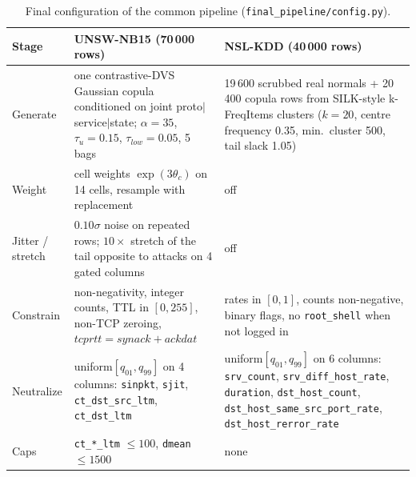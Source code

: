 \documentclass[10pt,a4paper]{article}
\begin{document}
\begin{table}[t]\centering\small
\begin{tabular}{P{2.0cm}P{6.7cm}P{6.7cm}}\toprule
Stage & UNSW-NB15 (70\,000 rows) & NSL-KDD (40\,000 rows)\\\midrule
Generate & one contrastive-DVS Gaussian copula conditioned on joint proto$|$service$|$state; $\alpha{=}35$, $\tau_{u}{=}0.15$, $\tau_{low}{=}0.05$, 5 bags & 19\,600 scrubbed real normals + 20\,400 copula rows from SILK-style k-FreqItems clusters ($k{=}20$, centre frequency 0.35, min.\ cluster 500, tail slack 1.05)\\
Weight & cell weights $\exp(3\theta_c)$ on 14 cells, resample with replacement & off\\
Jitter / stretch & $0.10\sigma$ noise on repeated rows; $10\times$ stretch of the tail opposite to attacks on 4 gated columns & off\\
Constrain & non-negativity, integer counts, TTL in $[0,255]$, non-TCP zeroing, $\textit{tcprtt}=\textit{synack}+\textit{ackdat}$ & rates in $[0,1]$, counts non-negative, binary flags, no \texttt{root\_shell} when not logged in\\
Neutralize & uniform$[q_{01},q_{99}]$ on 4 columns: \texttt{sinpkt}, \texttt{sjit}, \texttt{ct\_dst\_src\_ltm}, \texttt{ct\_dst\_ltm} & uniform$[q_{01},q_{99}]$ on 6 columns: \texttt{srv\_count}, \texttt{srv\_diff\_host\_rate}, \texttt{duration}, \texttt{dst\_host\_count}, \texttt{dst\_host\_same\_src\_port\_rate}, \texttt{dst\_host\_rerror\_rate}\\
Caps & \texttt{ct\_*\_ltm} $\le100$, \texttt{dmean} $\le1500$ & none\\\bottomrule
\end{tabular}
\caption{Final configuration of the common pipeline (\texttt{final\_pipeline/config.py}).}\label{tab:cfg}\end{table}
\end{document}
